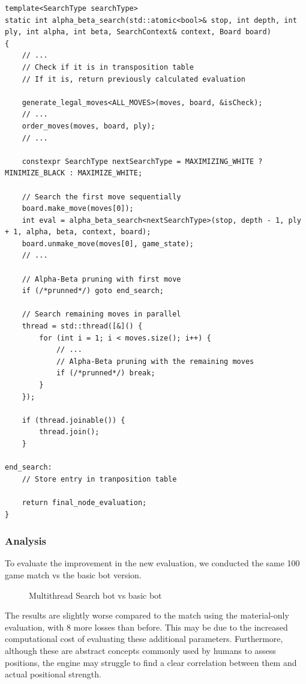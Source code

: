 \begin{lstlisting}[breaklines=true, frame=single]
template<SearchType searchType>
static int alpha_beta_search(std::atomic<bool>& stop, int depth, int ply, int alpha, int beta, SearchContext& context, Board board)
{
    // ...
    // Check if it is in transposition table
    // If it is, return previously calculated evaluation

    generate_legal_moves<ALL_MOVES>(moves, board, &isCheck);
    // ...
    order_moves(moves, board, ply);
    // ...
    
    constexpr SearchType nextSearchType = MAXIMIZING_WHITE ? MINIMIZE_BLACK : MAXIMIZE_WHITE;

    // Search the first move sequentially
    board.make_move(moves[0]);
    int eval = alpha_beta_search<nextSearchType>(stop, depth - 1, ply + 1, alpha, beta, context, board);
    board.unmake_move(moves[0], game_state);
    // ...

    // Alpha-Beta pruning with first move
    if (/*prunned*/) goto end_search;

    // Search remaining moves in parallel
    thread = std::thread([&]() {
        for (int i = 1; i < moves.size(); i++) {
            // ...
            // Alpha-Beta pruning with the remaining moves
            if (/*prunned*/) break;
        }
    });
    
    if (thread.joinable()) {
        thread.join();
    }

end_search:
    // Store entry in tranposition table

    return final_node_evaluation;
}
\end{lstlisting}

\subsubsection{Analysis}

To evaluate the improvement in the new evaluation, we conducted the same 100 game match vs the basic bot version. 

\begin{center}
    \begin{figure}[H]
        \centering
        \caption{Multithread Search bot vs basic bot}
        \label{fig:results_multithread_search_bot}
    \end{figure}
\medskip
\end{center}

\noindent The results are slightly worse compared to the match using the material-only evaluation, with 8 more losses than before. This may be due to the increased computational cost of evaluating these additional parameters. Furthermore, although these are abstract concepts commonly used by humans to assess positions, the engine may struggle to find a clear correlation between them and actual positional strength.

